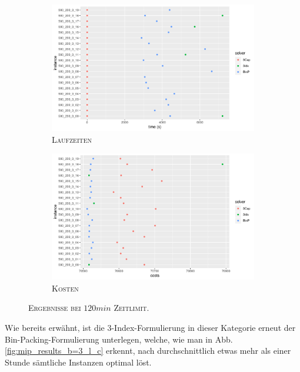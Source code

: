 \begin{figure}[H]
\centering
\begin{subfigure}[b]{0.4\textwidth}
\centering
\includegraphics[width=1.3\textwidth]{img/solver_instance_time_b=3_l_7200s.png}
\caption{\textsc{Laufzeiten}}
\label{fig:b=3_l_runtimes}
\end{subfigure}
\hfill
\begin{subfigure}[b]{0.4\textwidth}
\centering
\includegraphics[width=1.3\textwidth]{img/solver_instance_cost_b=3_l_7200s.png}
\caption{\textsc{Kosten}}
\label{fig:b=3_l_costs}
\end{subfigure}
\caption{\textsc{Ergebnisse bei $120min$ Zeitlimit}.}
\label{fig:res_plots_b=3_l}
\end{figure}

Wie bereits erwähnt, ist die 3-Index-Formulierung in dieser Kategorie erneut der Bin-Packing-Formulierung
unterlegen, welche, wie man in Abb. \ref{fig:mip_results_b=3_l_c} erkennt, nach durchschnittlich
etwas mehr als einer Stunde sämtliche Instanzen optimal löst.

